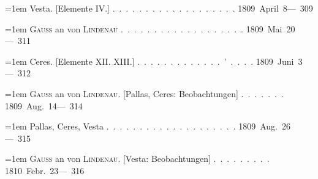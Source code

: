 \noindent\hangindent=1em Vesta. [Elemente IV.] \mbox{.\ .\ .\ .\ .\ .\ .\ .\ .\ .\ .\ .\ .\ .\ .\ .\ .\ .\ .} \hfill\mbox{1809 April 8}\quad\mbox{--- 309}\par\smallskip
\noindent\hangindent=1em \textsc{Gauss} an von \textsc{Lindenau} \mbox{.\ .\ .\ .\ .\ .\ .\ .\ .\ .\ .\ .\ .\ .\ .\ .\ .\ .\ .} \hfill\mbox{1809 Mai 20}\quad\mbox{--- 311}\par\smallskip
\noindent\hangindent=1em Ceres. [Elemente XII. XIII.] \mbox{.\ .\ .\ .\ .\ .\ .\ .\ .\ .\ .\ .\ .\ '\ .\ .\ .\ .} \hfill\mbox{1809 Juni 3}\quad\mbox{--- 312}\par\smallskip
\noindent\hangindent=1em \textsc{Gauss} an von \textsc{Lindenau}. [Pallas, Ceres: Beobachtungen] \mbox{.\ .\ .\ .\ .\ .\ .} \hfill\mbox{1809 Aug. 14}\quad\mbox{--- 314}\par\smallskip
\noindent\hangindent=1em Pallas, Ceres, Vesta \mbox{.\ .\ .\ .\ .\ .\ .\ .\ .\ .\ .\ .\ .\ .\ .\ .\ .\ .\ .\ .} \hfill\mbox{1809 Aug. 26}\quad\mbox{--- 315}\par\smallskip
\noindent\hangindent=1em \textsc{Gauss} an von \textsc{Lindenau}. [Vesta: Beobachtungen] \mbox{.\ .\ .\ .\ .\ .\ .\ .\ .} \hfill\mbox{1810 Febr. 23}\quad\mbox{--- 316}\par\smallskip
\endgroup
